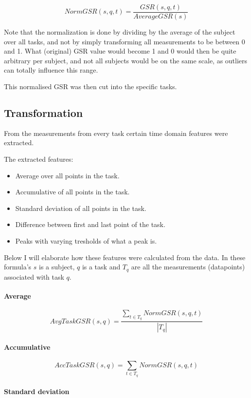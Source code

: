 \documentclass[11pt,leqno,a4paper]{report} %
\begin{document}
\[
NormGSR(s,q,t) = \frac{GSR(s,q,t)}{AverageGSR(s)}
\]

Note that the normalization is done by dividing by the average of the subject over all tasks, and not by simply transforming all measurements to be between 0 and 1. What (original) GSR value would become 1 and 0 would then be quite arbitrary per subject, and not all subjects would be on the same scale, as outliers can totally influence this range.

This normalised GSR was then cut into the specific tasks.

\subsection{Transformation}
From the measurements from every task certain time domain features were extracted. 

The extracted features:

\begin{itemize}

\item Average over all points in the task.
\item Accumulative of all points in the task.
\item Standard deviation of all points in the task.
\item Difference between first and last point of the task.
\item Peaks with varying tresholds of what a peak is.
\end{itemize}

Below I will elaborate how these features were calculated from the data. In these formula's $s$ is a subject, $q$ is a task and $T_q$ are all the measurements (datapoints) associated with task $q$.

\paragraph{Average}

\[
AvgTaskGSR(s,q) = \frac { \sum_{t \in T_q} NormGSR(s,q,t) }
{\left\vert{T_q}\right\vert }
\]

\paragraph{Accumulative}

\[
AccTaskGSR(s,q) =  \sum_{t \in T_q} NormGSR(s,q,t)
\]

\paragraph{Standard deviation}
\end{document}
